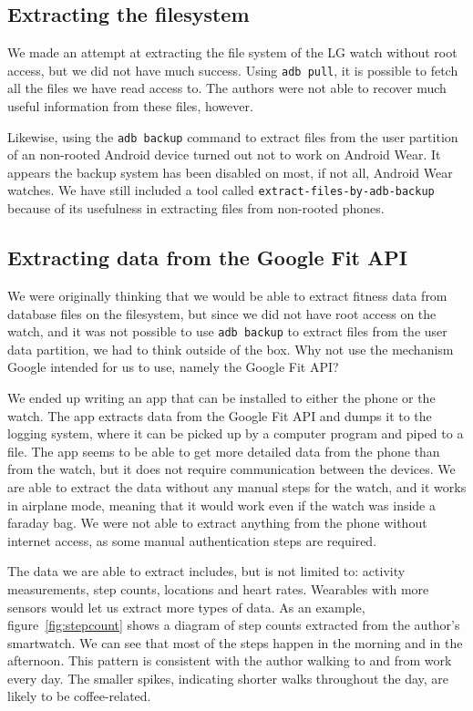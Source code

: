 \documentclass[a4paper,11pt,dvips]{article}
\begin{document}
\subsection{Extracting the filesystem}

We made an attempt at extracting the file system of the LG watch without root access, but we did not have much success. Using \texttt{adb pull}, it is possible to fetch all the files we have read access to. The authors were not able to recover much useful information from these files, however.

Likewise, using the \texttt{adb backup} command to extract files from the user partition of an non-rooted Android device turned out not to work on Android Wear. It appears the backup system has been disabled on most, if not all, Android Wear watches. We have still included a tool called \texttt{extract-files-by-adb-backup} because of its usefulness in extracting files from non-rooted phones.


\subsection{Extracting data from the Google Fit API}

We were originally thinking that we would be able to extract fitness data from database files on the filesystem, but since we did not have root access on the watch, and it was not possible to use \texttt{adb backup} to extract files from the user data partition, we had to think outside of the box. Why not use the mechanism Google intended for us to use, namely the Google Fit API?

We ended up writing an app that can be installed to either the phone or the watch. The app extracts data from the Google Fit API and dumps it to the logging system, where it can be picked up by a computer program and piped to a file. The app seems to be able to get more detailed data from the phone than from the watch, but it does not require communication between the devices. We are able to extract the data without any manual steps for the watch, and it works in airplane mode, meaning that it would work even if the watch was inside a faraday bag. We were not able to extract anything from the phone without internet access, as some manual authentication steps are required.

The data we are able to extract includes, but is not limited to: activity measurements, step counts, locations and heart rates. Wearables with more sensors would let us extract more types of data. As an example, figure~\ref{fig:stepcount} shows a diagram of step counts extracted from the author's smartwatch. We can see that most of the steps happen in the morning and in the afternoon. This pattern is consistent with the author walking to and from work every day. The smaller spikes, indicating shorter walks throughout the day, are likely to be coffee-related.
\end{document}

